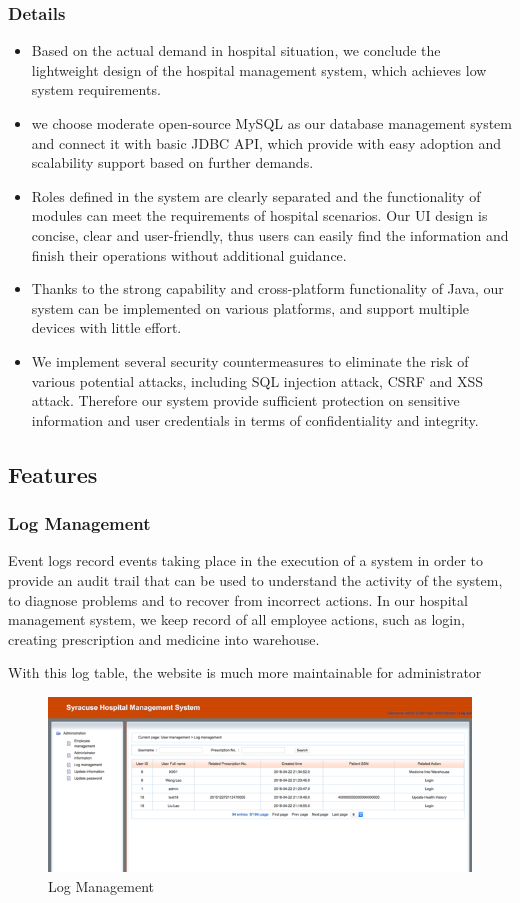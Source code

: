 \subsubsection{Details}
\begin{itemize}
    \item Based on the actual demand in hospital situation, we conclude the lightweight design of the hospital management system, which achieves low system requirements.
    \item we choose moderate open-source MySQL as our database management system and connect it with basic JDBC API, which provide with easy adoption and scalability support based on further demands.
    \item Roles defined in the system are clearly separated and the functionality of  modules can meet the requirements of hospital scenarios. Our UI design is concise, clear and user-friendly, thus users can easily find the information and finish their operations without additional guidance.
    \item Thanks to the strong capability and cross-platform functionality of Java, our system can be implemented on various platforms, and support multiple devices with little effort.
    \item We implement several security countermeasures to eliminate the risk of various potential attacks, including SQL injection attack, CSRF and XSS attack. Therefore our system provide sufficient protection on sensitive information and user credentials in terms of confidentiality and integrity.
\end{itemize}

\subsection{Features}
\subsubsection{Log Management}
Event logs record events taking place in the execution of a system in order to provide an audit trail that can be used to understand the activity of the system, to diagnose problems and to recover from incorrect actions. In our hospital management system, we keep record of all employee actions, such as login, creating prescription and medicine into warehouse.

With this log table, the website is much more maintainable for administrator
\begin{figure}[H]
    \centering
    \includegraphics[width=\textwidth]{fp/s1.png}
    \caption{Log Management}
    \label{fig:sp1}
\end{figure}
